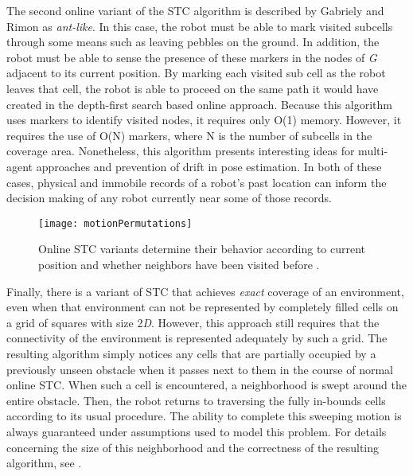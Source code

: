 The second online variant of the STC algorithm is described by Gabriely and Rimon as \textit{ant-like}. In this case, the robot must be able to mark visited subcells through some means such as leaving pebbles on the ground. In addition, the robot must be able to sense the presence of these markers in the nodes of \textit{G} adjacent to its current position. By marking each visited sub cell as the robot leaves that cell, the robot is able to proceed on the same path it would have created in the depth-first search based online approach. Because this algorithm uses markers to identify visited nodes, it requires only O(1) memory. However, it requires the use of O(N) markers, where N is the number of subcells in the coverage area. Nonetheless, this algorithm presents interesting ideas for multi-agent approaches and prevention of drift in pose estimation. In both of these cases, physical and immobile records of a robot's past location can inform the decision making of any robot currently near some of those records.

\begin{figure}[H]
\texttt{[image: motionPermutations]}
\caption[Neighbor Visiting Behavior for Online STC]{Online STC variants determine their behavior according to current position and whether neighbors have been visited before \cite{STC}.}
\end{figure}

Finally, there is a variant of STC that achieves \textit{exact} coverage of an environment, even when that environment can not be represented by completely filled cells on a grid of squares with size 2\textit{D}. However, this approach still requires that the connectivity of the environment is represented adequately by such a grid. The resulting algorithm simply notices any cells that are partially occupied by a previously unseen obstacle when it passes next to them in the course of normal online STC. When such a cell is encountered, a neighborhood is swept around the entire obstacle. Then, the robot returns to traversing the fully in-bounds cells according to its usual procedure. The ability to complete this sweeping motion is always guaranteed under assumptions used to model this problem. For details concerning the size of this neighborhood and the correctness of the resulting algorithm, see \cite{STC}.

